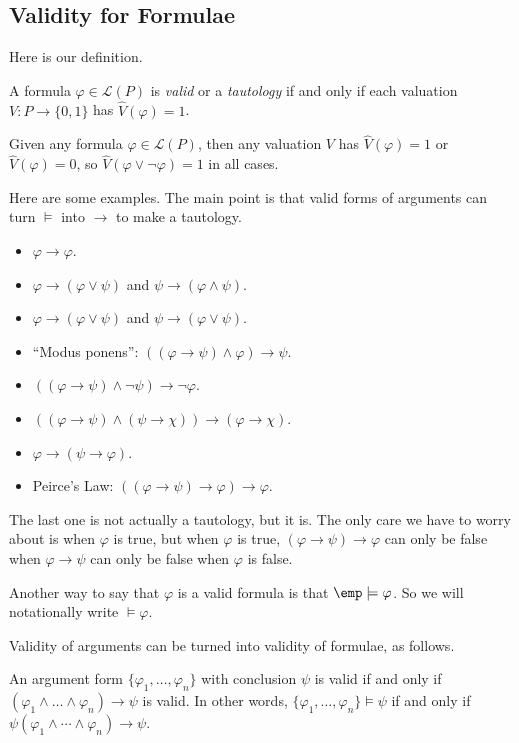 \documentclass[../notes.tex]{subfiles}
\begin{document}
\subsection{Validity for Formulae}
Here is our definition.
\begin{definition}
	A formula $\varphi\in\mathcal L(P)$ is \textit{valid} or a \textit{tautology} if and only if each valuation $V:P\to\{0,1\}$ has $\hat V(\varphi)=1$.
\end{definition}
\begin{example}
	Given any formula $\varphi\in\mathcal L(P)$, then any valuation $V$ has $\hat V(\varphi)=1$ or $\hat V(\varphi)=0$, so $\hat V(\varphi\lor\lnot\varphi)=1$ in all cases.
\end{example}
Here are some examples. The main point is that valid forms of arguments can turn $\models$ into $\to$ to make a tautology.
\begin{itemize}
	\item $\varphi\to\varphi$.
	\item $\varphi\to(\varphi\lor\psi)$ and $\psi\to(\varphi\land\psi)$.
	\item $\varphi\to(\varphi\lor\psi)$ and $\psi\to(\varphi\lor\psi)$.
	\item ``Modus ponens'': $((\varphi\to\psi)\land\varphi)\to\psi$.
	\item $((\varphi\to\psi)\land\lnot\psi)\to\lnot\varphi$.
	\item $((\varphi\to\psi)\land(\psi\to\chi))\to(\varphi\to\chi)$.
	\item $\varphi\to(\psi\to\varphi)$.
	\item Peirce's Law: $((\varphi\to\psi)\to\varphi)\to\varphi$.
\end{itemize}
The last one is not actually a tautology, but it is. The only care we have to worry about is when $\varphi$ is true, but when $\varphi$ is true, $(\varphi\to\psi)\to\varphi$ can only be false when $\varphi\to\psi$ can only be false when $\varphi$ is false.
\begin{remark}
	Another way to say that $\varphi$ is a valid formula is that $\emp\models\varphi$. So we will notationally write $\models\varphi$.
\end{remark}
Validity of arguments can be turned into validity of formulae, as follows.
\begin{theorem}[Deduction]
	An argument form $\{\varphi_1,\ldots,\varphi_n\}$ with conclusion $\psi$ is valid if and only if $(\varphi_1\land\ldots\land\varphi_n)\to\psi$ is valid. In other words, $\{\varphi_1,\ldots,\varphi_n\}\models\psi$ if and only if $\psi(\varphi_1\land\cdots\land\varphi_n)\to\psi$.
\end{theorem}
\end{document}
